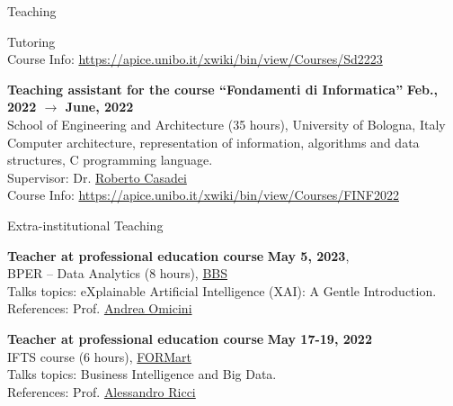 \documentclass{resume} %
\begin{document}
\begin{rSection}{Teaching}
\begin{rSubsection2}{Tutoring}
            \\Course Info: \url{https://apice.unibo.it/xwiki/bin/view/Courses/Sd2223}
            \item\textbf{ Teaching assistant for the course ``Fondamenti di Informatica'' }\hfill \textbf{Feb., 2022 $\rightarrow$ June, 2022}
            \\School of Engineering and Architecture (35 hours), University of Bologna, Italy
            \\Computer architecture, representation of information, algorithms and data structures, C programming language.
            \\Supervisor: Dr. \href{mailto:roberto.casadei@unibo.it}{Roberto Casadei}
            \\Course Info: \url{https://apice.unibo.it/xwiki/bin/view/Courses/FINF2022}
        \end{rSubsection2}


        \begin{rSubsection2}{Extra-institutional Teaching}
            \item\textbf{ Teacher at professional education course }\hfill \textbf{May 5, 2023},
            \\BPER -- Data Analytics (8 hours), \href{https://www.bbs.unibo.eu/}{BBS}
            \\Talks topics: eXplainable Artificial Intelligence (XAI): A Gentle Introduction.
            \\References:  Prof. \href{mailto:andrea.omicini@unibo.it}{Andrea Omicini}
            \item\textbf{ Teacher at professional education course }\hfill \textbf{May 17-19, 2022}
            \\IFTS course (6 hours), \href{http://www.formart.it/home}{FORMart}
            \\Talks topics: Business Intelligence and Big Data.
            \\References:  Prof. \href{mailto:a.ricci@unibo.it}{Alessandro Ricci}
        \end{rSubsection2}



\end{rSection}
\end{document}
